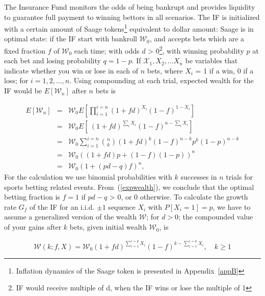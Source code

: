 \documentclass[%
 aapm,
 mph,%
 amsmath,amssymb,
 reprint,%
]{revtex4-2}
\begin{document}
The Insurance Fund monitors the odds of being bankrupt and provides liquidity to guarantee full payment to winning bettors in all scenarios. The IF is initialized with a certain amount of Saage tokens\footnote{Inflation dynamics of the Saage token is presented in Appendix~\ref{appB}} equivalent to dollar amount: 
Saage is in optimal state: if the IF start with bankroll $\mathcal{W}_0$, and accepts bets which are a fixed fraction $f$ of $\mathcal{W}_0$ each time; with odds $d$ > 0\footnote{IF would receive multiple of d, when the IF wins or lose the multiple of 1}, with winning probability $p$ at each bet and losing probability  $q = 1 - p$.
If $\mathcal{X}_1, X_2, … X_n$ be variables that indicate whether you win or lose in each of $n$ bets, where $X_i$ = 1 if a win, 0 if a loss; for $i = 1, 2, \ldots, n$. Using compounding at each trial, expected wealth for the IF would be $E[\mathcal{W}_n]$ after $n$ bets is 

\begin{eqnarray}
E[\mathcal{W}_n] &=& \mathcal{W}_0 E \left[ \prod_{i=1}^{i=n} (1 + f d)^{X_i} (1 - f)^{1 - X_i} \right] \ \nonumber\\
&=& \mathcal{W}_0 E [\ (1 + f d)^{\sum_i X_i} (1 - f)^{n - \sum_i X_i} ]\ \nonumber\\
&=& \mathcal{W}_0 \sum_{i=1}^{i=n} {n \choose k} (1 + f d)^ k (1 - f)^{n - k} p^k (1 - p)^{n-k} \nonumber\\
&=& \mathcal{W}_0 ((1 + f d)p + (1 - f)(1 - p))^n \nonumber\\
&=& \mathcal{W}_0 (1 + (pd - q)f)^n , 
\label{expwealth}
\end{eqnarray}
For the calculation we use binomial probabilities with $k$ successes in $n$ trials for sports betting related events. From~(\ref{expwealth}), we conclude that the optimal betting fraction is $f = 1$ if $pd - q$ > 0, or 0 otherwise. 
To calculate the growth rate $G_f$ of the IF for an i.i.d. $\pm1$ sequence $X_i$ with $P[X_i = 1] = p$, we have to assume a generalized version of the wealth $\mathcal{W}$; for $d >0$; the compounded value of your gains after $k$ bets, given initial wealth $\mathcal{W}_0$, is 

\begin{equation} 
\mathcal{W}(k; f, X) = \mathcal{W}_0(1 + f d)^{\sum_{i=1}^{i=k} X_i} (1 - f)^{k - \sum_{i=1}^{i=k} X_i}, \quad k \geq 1
\end{equation}
\end{document}
